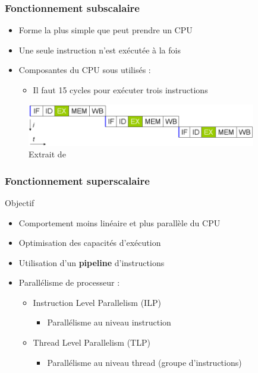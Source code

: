 \begin{frame}
\frametitle{Fonctionnement subscalaire}
\begin{itemize}
\item  Forme la plus simple que peut prendre un CPU
\item Une seule instruction n'est exécutée à la fois
\item Composantes du CPU sous utilisés :
\begin{itemize}
\item Il faut 15 cycles pour exécuter trois instructions
\end{itemize}
\end{itemize}
\begin{figure}
\includegraphics[width=10cm]{../illustration/processeur-fonc_subscalaire.png}
\caption{Extrait de \cite{wp-cpu}}
\end{figure}
\end{frame}

\begin{frame}
\frametitle{Fonctionnement superscalaire}
\begin{block}{Objectif}
\begin{itemize}
\item Comportement moins linéaire et plus parallèle du CPU
\item Optimisation des capacités d'exécution
\end{itemize}
\end{block}
\begin{itemize}
\item Utilisation d'un \textbf{pipeline} d'instructions 
\item Parallélisme de processeur :
\begin{itemize}
\item Instruction Level Parallelism (ILP) 
\begin{itemize}
\item Parallélisme au niveau instruction
\end{itemize}
\item Thread Level Parallelism (TLP)  
\begin{itemize}
\item Parallélisme au niveau thread (groupe d'instructions)
\end{itemize}
\end{itemize}
\end{itemize}
\end{frame}

